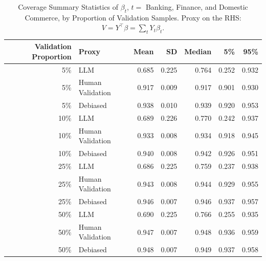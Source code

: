 \begin{table}

\caption{Coverage Summary Statistics of $\beta_{t}$, $t=$ Banking, Finance, and Domestic Commerce, by Proportion of Validation Samples.
      Proxy on the RHS: $V = Y^\top \beta = \sum_{t} Y_t \beta_t$.}
\centering
\begin{tabular}[t]{rlrrrrr}
\toprule
Validation Proportion & Proxy & Mean & SD & Median & 5\% & 95\%\\
\midrule
5\% & LLM & 0.685 & 0.225 & 0.764 & 0.252 & 0.932\\
5\% & Human Validation & 0.917 & 0.009 & 0.917 & 0.901 & 0.930\\
5\% & Debiased & 0.938 & 0.010 & 0.939 & 0.920 & 0.953\\
10\% & LLM & 0.689 & 0.226 & 0.770 & 0.242 & 0.937\\
10\% & Human Validation & 0.933 & 0.008 & 0.934 & 0.918 & 0.945\\
10\% & Debiased & 0.940 & 0.008 & 0.942 & 0.926 & 0.951\\
25\% & LLM & 0.686 & 0.225 & 0.759 & 0.237 & 0.938\\
25\% & Human Validation & 0.943 & 0.008 & 0.944 & 0.929 & 0.955\\
25\% & Debiased & 0.946 & 0.007 & 0.946 & 0.937 & 0.957\\
50\% & LLM & 0.690 & 0.225 & 0.766 & 0.255 & 0.935\\
50\% & Human Validation & 0.947 & 0.007 & 0.948 & 0.936 & 0.959\\
50\% & Debiased & 0.948 & 0.007 & 0.949 & 0.937 & 0.958\\
\bottomrule
\end{tabular}
\end{table}
